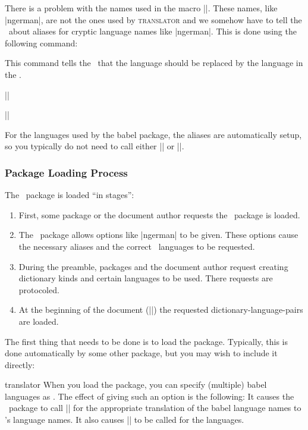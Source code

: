 There is a problem with the names used in the macro |\languagename|. These names, like |ngerman|, are not the ones used by \textsc{translator} and we somehow have to tell the \translatorname\ about aliases for cryptic language names like |ngerman|. This is done using the following command:

\begin{command}{\languagealias{}}
  This command tells the \translatorname\ that the language  should be replaced by the language in the .

  \example
  ||

  \example
  ||
\end{command}

For the languages used by the babel package, the aliases are automatically setup, so you typically do not need to call either |\languagepath| or |\languagealias|.

\subsubsection{Package Loading Process}

The \translatorname\ package is loaded ``in stages'':
\begin{enumerate}
\item
  First, some package or the document author requests the \translatorname\ package is loaded.
\item
  The \translatorname\ package allows options like |ngerman| to be given. These options cause the necessary aliases and the correct \translatorname\ languages to be requested.
\item
  During the preamble, packages and the document author request creating dictionary kinds and certain languages to be used. There requests are protocoled.
\item
  At the beginning of the document (||) the requested dictionary-language-pairs are loaded.
\end{enumerate}

The first thing that needs to be done is to load the package. Typically, this is done automatically by some other package, but you may wish to include it directly:

\begin{package}{{translator}}
  When you load the package, you can specify (multiple) babel languages as . The effect of giving such an option is the following: It causes the \translatorname\ package to call |\uselanguage| for the appropriate translation of the babel language names to \translatorname's language names. It also causes |\languagealias| to be called for the languages.
\end{package}
